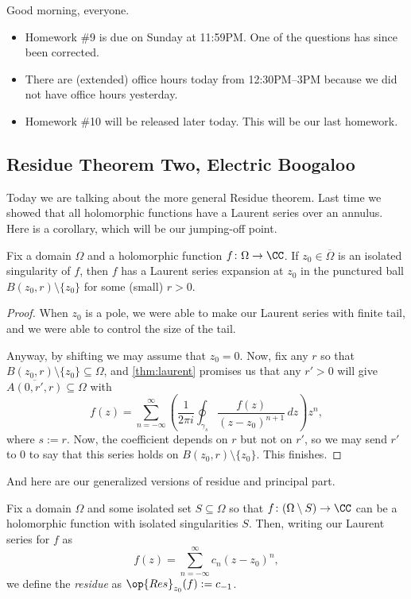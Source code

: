 
Good morning, everyone.
\begin{itemize}
	\item Homework \#9 is due on Sunday at 11:59PM. One of the questions has since been corrected.
	\item There are (extended) office hours today from 12:30PM--3PM because we did not have office hours yesterday.
	\item Homework \#10 will be released later today. This will be our last homework.
\end{itemize}

\subsection{Residue Theorem Two, Electric Boogaloo}
Today we are talking about the more general Residue theorem. Last time we showed that all holomorphic functions have a Laurent series over an annulus. Here is a corollary, which will be our jumping-off point.
\begin{corollary}
	Fix a domain $\Omega$ and a holomorphic function $f\colon\Omega\to\CC$. If $z_0\in\overline\Omega$ is an isolated singularity of $f$, then $f$ has a Laurent series expansion at $z_0$ in the punctured ball $B(z_0,r)\setminus\{z_0\}$ for some (small) $r>0$.
\end{corollary}
\begin{proof}
	When $z_0$ is a pole, we were able to make our Laurent series with finite tail, and we were able to control the size of the tail.

	Anyway, by shifting we may assume that $z_0=0$. Now, fix any $r$ so that $B(z_0,r)\setminus\{z_0\}\subseteq\Omega$, and \autoref{thm:laurent} promises us that any $r'>0$ will give $\overline{A(0,r',r)}\subseteq\Omega$ with
	\[f(z)=\sum_{n=-\infty}^\infty\left(\frac1{2\pi i}\oint_{\gamma_s}\frac{f(z)}{(z-z_0)^{n+1}}\,dz\right)z^n,\]
	where $s:=r$. Now, the coefficient depends on $r$ but not on $r'$, so we may send $r'$ to $0$ to say that this series holds on $B(z_0,r)\setminus\{z_0\}$. This finishes.
\end{proof}
And here are our generalized versions of residue and principal part.
\begin{definition}[Residue]
	Fix a domain $\Omega$ and some isolated set $S\subseteq\Omega$ so that $f\colon(\Omega\setminus S)\to\CC$ can be a holomorphic function with isolated singularities $S$. Then, writing our Laurent series for $f$ as
	\[f(z)=\sum_{n=-\infty}^\infty c_n(z-z_0)^n,\]
	we define the \textit{residue} as $\op{Res}_{z_0}(f):=c_{-1}$.
\end{definition}
